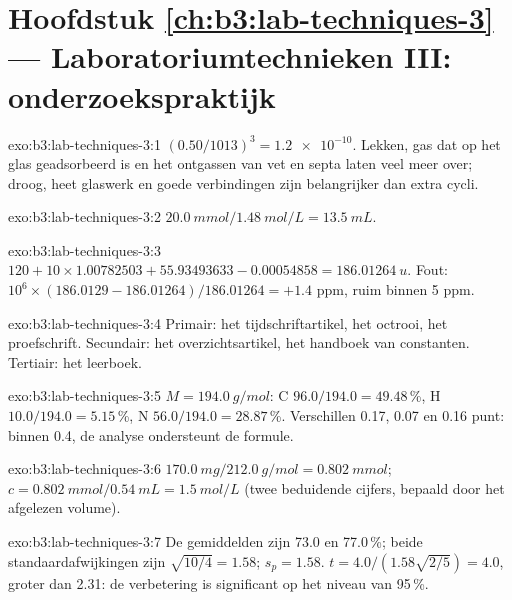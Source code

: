 \section*{Hoofdstuk \ref{ch:b3:lab-techniques-3} --- Laboratoriumtechnieken III: onderzoekspraktijk}

\begin{solution}{exo:b3:lab-techniques-3:1}
$(0.50/1013)^3 = \num{1.2e-10}$. Lekken, gas dat op het glas geadsorbeerd is en het ontgassen van
vet en septa laten veel meer over; droog, heet glaswerk en goede
verbindingen zijn belangrijker dan extra cycli.
\end{solution}

\begin{solution}{exo:b3:lab-techniques-3:2}
$\qty{20.0}{mmol}/\qty{1.48}{mol/L} = \qty{13.5}{mL}$.
\end{solution}

\begin{solution}{exo:b3:lab-techniques-3:3}
$120 + 10 \times 1.00782503 + 55.93493633 - 0.00054858 = \qty{186.01264}{u}$. Fout: $10^6 \times (186.0129 - 186.01264)/186.01264 = +1.4$ ppm,
ruim binnen 5 ppm.
\end{solution}

\begin{solution}{exo:b3:lab-techniques-3:4}
Primair: het tijdschriftartikel, het octrooi, het proefschrift.
Secundair: het overzichtsartikel, het handboek van constanten.
Tertiair: het leerboek.
\end{solution}

\begin{solution}{exo:b3:lab-techniques-3:5}
$M = \qty{194.0}{g/mol}$: C $96.0/194.0 = 49.48$\,\%, H $10.0/194.0 = 5.15$\,\%, N $56.0/194.0 = 28.87$\,\%. Verschillen 0.17, 0.07 en 0.16
punt: binnen 0.4, de analyse ondersteunt de formule.
\end{solution}

\begin{solution}{exo:b3:lab-techniques-3:6}
$\qty{170.0}{mg}/\qty{212.0}{g/mol} = \qty{0.802}{mmol}$; $c = \qty{0.802}{mmol}/\qty{0.54}{mL} = \qty{1.5}{mol/L}$ (twee beduidende cijfers, bepaald door
het afgelezen volume).
\end{solution}

\begin{solution}{exo:b3:lab-techniques-3:7}
De gemiddelden zijn 73.0 en 77.0\,\%; beide standaardafwijkingen zijn $\sqrt{10/4} = 1.58$; $s_p = 1.58$. $t = 4.0/(1.58\sqrt{2/5}) = 4.0$, groter dan
2.31: de verbetering is significant op het niveau van 95\,\%.
\end{solution}

